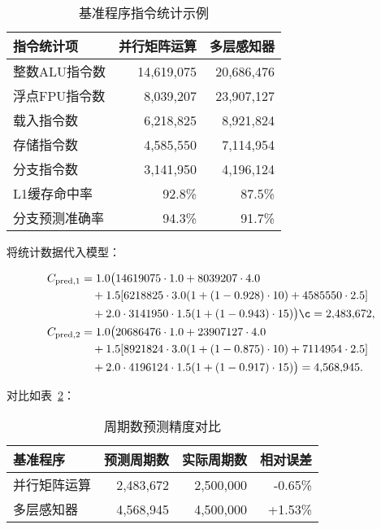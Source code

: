 \documentclass[bachelor]{thesis-uestc}
\begin{document}
\begin{table}[htbp]
\caption{基准程序指令统计示例}
\centering
\begin{tabular}{|l|r|r|}
\hline
\textbf{指令统计项} & \textbf{并行矩阵运算} & \textbf{多层感知器} \\
\hline
整数ALU指令数     & 14,619,075 & 20,686,476 \\
\hline
浮点FPU指令数     & 8,039,207 & 23,907,127 \\
\hline
载入指令数         & 6,218,825 & 8,921,824 \\
\hline
存储指令数         & 4,585,550 & 7,114,954 \\
\hline
分支指令数         & 3,141,950 & 4,196,124 \\
\hline
L1缓存命中率       & 92.8\%     & 87.5\%     \\
\hline
分支预测准确率     & 94.3\%     & 91.7\%     \\
\hline
\end{tabular}
\label{tab:instr_stats_example}
\end{table}

将统计数据代入模型：

\begin{align}
C_{\mathrm{pred},1}
&= 1.0\bigl(14619075\cdot1.0 + 8039207\cdot4.0 \nonumber\\
&\quad + 1.5[6218825\cdot3.0(1+(1-0.928)\cdot10)
           +4585550\cdot2.5]\nonumber\\
&\quad +2.0\cdot3141950\cdot1.5(1+(1-0.943)\cdot15)\bigr)\c
=2{,}483{,}672,\\
C_{\mathrm{pred},2}
&= 1.0\bigl(20686476\cdot1.0 + 23907127\cdot4.0 \nonumber\\
&\quad + 1.5[8921824\cdot3.0(1+(1-0.875)\cdot10)
           +7114954\cdot2.5]\nonumber\\
&\quad +2.0\cdot4196124 \cdot1.5(1+(1-0.917)\cdot15)\bigr)
=4{,}568{,}945.
\end{align}

对比如表~\ref{tab:cycle_prediction_accuracy}：

\begin{table}[htbp]
\caption{周期数预测精度对比}
\centering
\begin{tabular}{|l|r|r|r|}
\hline
\textbf{基准程序} & \textbf{预测周期数} & \textbf{实际周期数} & \textbf{相对误差} \\
\hline
并行矩阵运算 & 2,483,672 & 2,500,000 & -0.65\% \\
\hline
多层感知器   & 4,568,945 & 4,500,000 & +1.53\% \\
\hline
\end{tabular}
\label{tab:cycle_prediction_accuracy}
\end{table}
\end{document}
